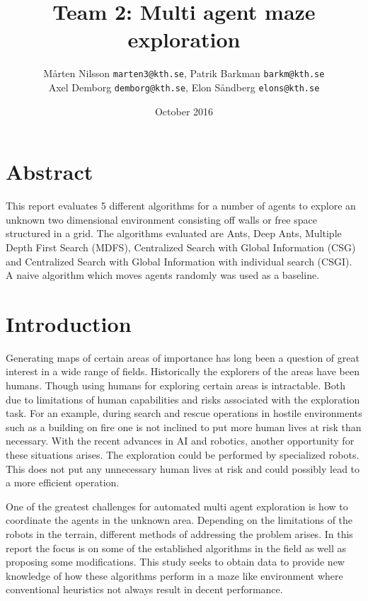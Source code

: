 \documentclass{article}
\title{Team 2: Multi agent maze exploration}
\author{ Mårten Nilsson \texttt{marten3@kth.se}, Patrik Barkman
  \texttt{barkm@kth.se} \\ Axel Demborg \texttt{demborg@kth.se}, Elon Såndberg
  \texttt{elons@kth.se}}
\date{October 2016}
\begin{document}
\maketitle

\section{Abstract}
This report evaluates 5 different algorithms for a number of agents to explore an unknown two dimensional environment consisting off walls or free space structured in a grid. The algorithms evaluated are Ants, Deep Ants, Multiple Depth First Search (MDFS), Centralized Search with Global Information (CSG) and Centralized Search with Global Information with individual search (CSGI). A naive algorithm which moves agents randomly was used as a baseline. 

\section{Introduction}

Generating maps of certain areas of importance has long been a question of great interest in a
wide range of fields. Historically the explorers of the areas have been humans.
Though using humans for exploring certain areas is intractable. Both due to
limitations of human capabilities and risks associated with the exploration
task. For an example, during search and rescue operations in hostile
environments such as a building on fire one is not inclined to put more human
lives at risk than necessary. With the recent advances in AI and robotics,
another opportunity for these situations arises. The exploration could be
performed by specialized robots. This does not put any unnecessary human lives
at risk and could possibly lead to a more efficient operation.

One of the greatest challenges for automated multi agent exploration is how to
coordinate the agents in the unknown area. Depending on the limitations of the
robots in the terrain, different methods of addressing the problem arises. In
this report the focus is on some of the established algorithms in the field as
well as proposing some modifications. This study seeks to obtain data to provide
new knowledge of how these algorithms perform in a maze like environment where
conventional heuristics not always result in decent performance.
\end{document}

